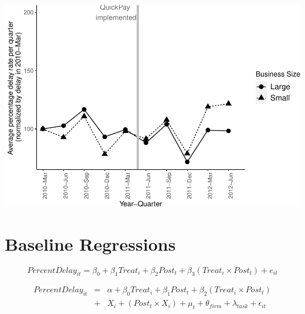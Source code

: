 \documentclass[
]{article}
\begin{document}
\includegraphics{qp_first_pc_delay_files/figure-latex/normalized_plot-1.pdf}

\hypertarget{baseline-regressions}{%
\section{Baseline Regressions}\label{baseline-regressions}}

\[ PercentDelay_{it} = \beta_0 + \beta_1 Treat_i + \beta_2 Post_t + \beta_3 (Treat_i \times Post_t) + e_{it}\]

\[ \begin{aligned} PercentDelay_{it} &=& \alpha+\beta_0 Treat_i + \beta_1 Post_t + \beta_2 (Treat_i \times Post_t)\\
&+&  X_i + (Post_t \times X_i) + \mu_t + \theta_{firm} + \lambda_{task}+ \epsilon_{it}
\end{aligned}\]
\end{document}
